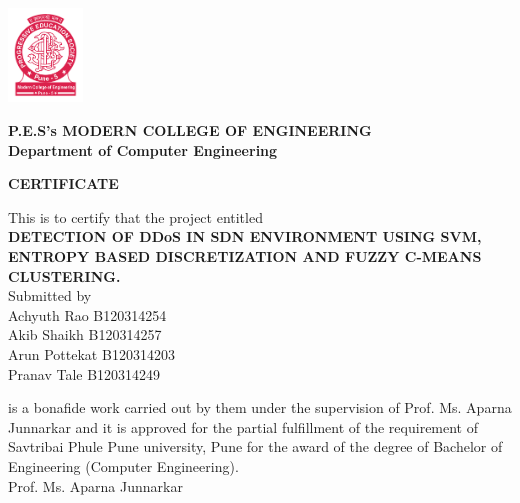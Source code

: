 \documentclass[12pt,a4paper,final]{report}
\begin{document}
\thispagestyle{empty}
\vspace*{1.3cm}
\includegraphics[width=2cm, height=2.5cm]{collegelogo.png}
\vspace*{-2.5cm}
\begin{center}
\normalsize
\textbf{
P.E.S's MODERN COLLEGE OF ENGINEERING \\
\vspace*{0.25cm}
Department of Computer Engineering \\
}
\vspace{3cm}

\Large
\textbf{CERTIFICATE}
\end{center}
\normalsize
\vspace{0.5cm}
\begin{center}
This is to certify that the project entitled \\
\large
\vspace*{0.3cm}
\textbf{
DETECTION OF DDoS IN SDN ENVIRONMENT USING SVM, ENTROPY  BASED DISCRETIZATION AND FUZZY C-MEANS CLUSTERING. \\
}
\vspace*{0.5cm}
\normalsize
Submitted by \\
Achyuth Rao \hspace*{2.2cm} B120314254 \\
Akib Shaikh \hspace*{2.4cm} B120314257 \\
Arun Pottekat \hspace*{2.2cm} B120314203 \\
Pranav Tale \hspace*{2.5cm} B120314249 \\
\end{center}
\vspace{1cm}
is a bonafide work carried out by them under the supervision of Prof. Ms. Aparna Junnarkar and it is approved for the partial fulfillment of the requirement of Savtribai Phule Pune university, Pune for the award of the degree of Bachelor of Engineering (Computer Engineering). \vspace{2.5cm}\\
\hspace*{0.8cm}
Prof. Ms. Aparna Junnarkar
\hspace{6cm}
\end{document}
